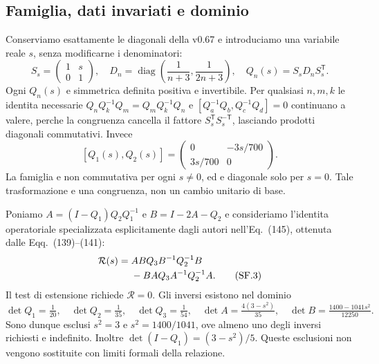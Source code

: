 \documentclass[11pt,a4paper]{article}
\begin{document}
\subsection*{Famiglia, dati invariati e dominio}
Conserviamo esattamente le diagonali della v0.67 e introduciamo una variabile reale $s$, senza modificarne i denominatori:
\begin{equation}
\boxed{S_s=\begin{pmatrix}1&s\\0&1\end{pmatrix},\quad
D_n=\operatorname{diag}\!\left(\frac1{n+3},\frac1{2n+3}\right),\quad
Q_n(s)=S_sD_nS_s^{\mathsf T}.}\tag{SF.1}
\end{equation}
Ogni $Q_n(s)$ e simmetrica definita positiva e invertibile. Per qualsiasi $n,m,k$ le identita necessarie \mbox{$Q_nQ_k^{-1}Q_m=Q_mQ_k^{-1}Q_n$} e $[Q_a^{-1}Q_b,Q_c^{-1}Q_d]=0$ continuano a valere, perche la congruenza cancella il fattore $S_s^{\mathsf T}S_s^{-\mathsf T}$, lasciando prodotti diagonali commutativi. Invece
\begin{equation}
\boxed{[Q_1(s),Q_2(s)]=\begin{pmatrix}0&-3s/700\\3s/700&0\end{pmatrix}.}\tag{SF.2}
\end{equation}
La famiglia e non commutativa per ogni $s\ne0$, ed e diagonale solo per $s=0$. Tale trasformazione e una congruenza, non un cambio unitario di base.

Poniamo $A=(I-Q_1)Q_2Q_1^{-1}$ e $B=I-2A-Q_2$ e consideriamo l'identita operatoriale specializzata esplicitamente dagli autori nell'Eq.~(145), ottenuta dalle Eqq.~(139)--(141):
\begin{align}
\mathcal R(s)={}&ABQ_3B^{-1}Q_2^{-1}B\notag\\[-1pt]
&{}-BAQ_3A^{-1}Q_2^{-1}A.\tag{SF.3}
\end{align}
Il test di estensione richiede $\mathcal R=0$. Gli inversi esistono nel dominio
\begin{equation}
\det Q_1=\tfrac1{20},\quad\det Q_2=\tfrac1{35},\quad\det Q_3=\tfrac1{54},\quad
\det A=\tfrac{4(3-s^2)}{35},\quad
\det B=\tfrac{1400-1041s^2}{12250}.\tag{SF.4}
\end{equation}
Sono dunque esclusi $s^2=3$ e $s^2=1400/1041$, ove almeno uno degli inversi richiesti e indefinito. Inoltre $\det(I-Q_1)=(3-s^2)/5$. Queste esclusioni non vengono sostituite con limiti formali della relazione.

\clearpage
\end{document}
